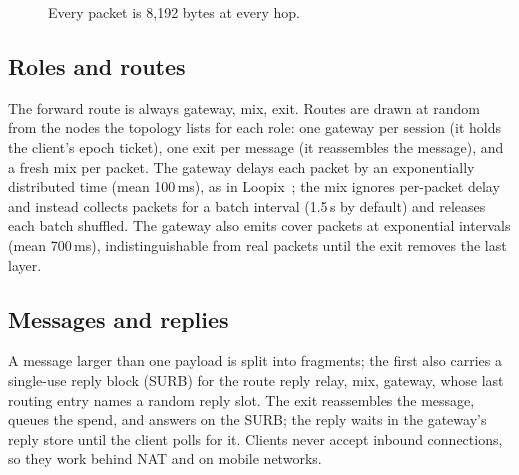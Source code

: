 \documentclass[11pt,a4paper]{article}
\begin{document}
\begin{figure}[ht]
\centering
{}
\caption{Every packet is 8,192 bytes at every hop.}
\end{figure}

\subsection{Roles and routes}
The forward route is always gateway, mix, exit. Routes are drawn at random from the nodes the topology
lists for each role: one gateway per session (it holds the client's epoch ticket), one exit per message
(it reassembles the message), and a fresh mix per packet. The gateway delays each packet by an exponentially
distributed time (mean 100\,ms), as in Loopix~\cite{loopix}; the mix ignores per-packet delay and instead
collects packets for a batch interval (1.5\,s by default) and releases each batch shuffled. The gateway
also emits cover packets at exponential intervals (mean 700\,ms), indistinguishable from real packets
until the exit removes the last layer.

\subsection{Messages and replies}
A message larger than one payload is split into fragments; the first also carries a single-use reply
block (SURB) for the route reply relay, mix, gateway, whose last routing entry names a random reply slot.
The exit reassembles the message, queues the spend, and answers on the SURB; the reply waits in the
gateway's reply store until the client polls for it. Clients never accept inbound connections, so they
work behind NAT and on mobile networks.

\end{document}
